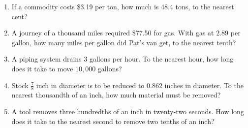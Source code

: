 \documentclass[12pt]{article}
\begin{document}
\begin{enumerate}
\item If a commodity costs \$3.19 per ton, how much is 48.4 tons, to the nearest cent? 
\spacing

\item A journey of a thousand miles required \$77.50 for gas. With gas at $2.89$ per gallon, how many miles per gallon did  Pat's van get, to the nearest tenth? 
\spacing

\item A piping system drains $3$ gallons per hour. To the nearest hour, how long does it take to move $10,000$ gallons? 
\spacing

\item Stock $\frac{7}{8}$ inch in diameter is to be reduced to $0.862$ inches in diameter. To the nearest thousandth of an inch, how much material must be removed? 
\spacing

\item A tool removes three hundredths of an inch in twenty-two seconds. How long does it take to the nearest second to remove two tenths of an inch? 
\spacing

\end{enumerate}
\end{document}

